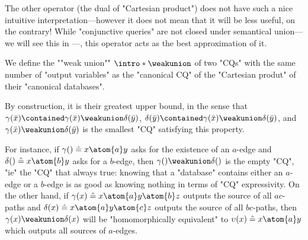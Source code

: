 The other operator (the dual of "Cartesian product")
does not have such a nice intuitive interpretation---however
it does not mean that it will be less useful, on the contrary!
While "conjunctive queries" are not closed under
semantical union---we will see this in ---, this operator
acts as the best approximation of it.

\begin{definition}
	We define the \AP""weak union"" \AP$\intro*\weakunion$ of two "CQs"
	with the same number of "output variables"
	as the "canonical CQ" of the "Cartesian produt" of their "canonical databases".
\end{definition}

By construction, it is their greatest upper bound,
in the sense that
$\gamma(\bar x) \contained \gamma(\bar x) \weakunion \delta(\bar y)$,
$\delta(\bar y) \contained \gamma(\bar x) \weakunion \delta(\bar y)$,
and $\gamma(\bar x) \weakunion \delta(\bar y)$ is the smallest "CQ" satisfying this property.

For instance, if $\gamma() \defeq x \atom{a} y$ asks for the existence of an $a$-edge
and $\delta() \defeq x \atom{b} y$ asks for a $b$-edge,
then $\gamma() \weakunion \delta()$ is the empty "CQ",
"ie" the "CQ" that always true: knowing that a "database" contains either an $a$-edge
or a $b$-edge is as good as knowing nothing in terms of "CQ" expressivity.
On the other hand, if $\gamma(x) \defeq x \atom{a} y \atom{b} z$ outputs the source of all 
$ac$-paths and $\delta(x) \defeq x \atom{a} y \atom{c} z$ outputs the source of all $bc$-paths,
then $\gamma(x) \weakunion \delta(x)$ will be "homomorphically equivalent" to
$\upsilon(x) \defeq x \atom{a} y$ which outputs all sources of $a$-edges.


